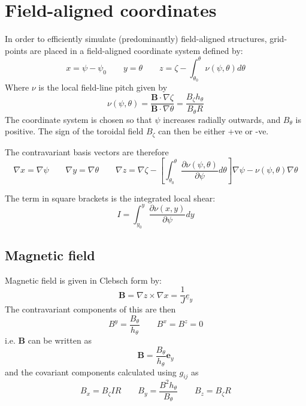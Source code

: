 \documentclass[12pt]{article}
\newcommand{\deriv}[2]{\ensuremath{\frac{\partial #1}{\partial #2}}}
\newcommand{\hthe}{\ensuremath{h_\theta}}
\newcommand{\Bp}{\ensuremath{B_\theta}}
\newcommand{\Bt}{\ensuremath{B_\zeta}}
\newcommand{\Vec}[1]{\ensuremath{\mathbf{#1}}}
\newcommand{\Bvec}{\Vec{B}}
\begin{document}
\section{Field-aligned coordinates}

In order to efficiently simulate (predominantly) field-aligned structures, grid-points
are placed in a field-aligned coordinate system defined by:
\begin{equation}
x = \psi - \psi_0 \qquad y = \theta \qquad z = \zeta - \int_{\theta_0}^{\theta}\nu\left(\psi, \theta\right)d\theta
\label{eq:coordtransform}
\end{equation}
Where $\nu$ is the local field-line pitch given by
\begin{equation}
\nu\left(\psi, \theta\right) = \frac{\mathbf{B}\cdot\nabla\zeta}{\mathbf{B}\cdot\nabla\theta} = \frac{\Bt\hthe}{\Bp R}
\end{equation}
The coordinate system is chosen so that $\psi$ increases radially outwards, and 
$\Bp$ is positive. The sign of the toroidal field $\Bt$ can then be either +ve or -ve.

The contravariant basis vectors are therefore
\[
\nabla x = \nabla \psi \qquad \nabla y = \nabla \theta \qquad \nabla z = \nabla\zeta - \left[\int_{\theta_0}^\theta\deriv{\nu\left(\psi, \theta\right)}{\psi} d\theta\right] \nabla\psi - \nu\left(\psi, \theta\right)\nabla\theta
\]

The term in square brackets is the integrated local shear:
\[
I = \int_{y_0}^y\frac{\partial\nu\left(x, y\right)}{\partial\psi}dy
\]

\subsection{Magnetic field}

Magnetic field is given in Clebsch form by:
\[
\mathbf{B} = \nabla z\times \nabla x = \frac{1}{J}\underline{e}_y
\]
The contravariant components of this are then
\begin{equation}
B^y = \frac{\Bp}{\hthe} \qquad B^x = B^z = 0
\label{eq:B_contravariant}
\end{equation}
i.e. $\Bvec$ can be written as
\begin{equation}
\Bvec = \frac{\Bp}{\hthe}\mathbf{e}_y
\label{eq:Bvec_cont}
\end{equation}
and the covariant components calculated using $g_{ij}$ as
\begin{equation}
B_x = \Bt I R \qquad B_y = \frac{B^2 \hthe}{\Bp} \qquad B_z = \Bt R
\label{eq:B_covariant}
\end{equation}
\end{document}
